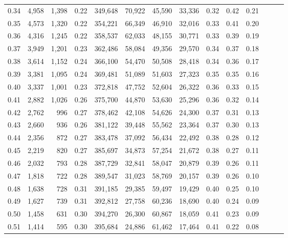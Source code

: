 \begin{tabular}{rrrrrrrrrrrrrr}
0.34 &   4,958 &  1,398 &  0.22 &  349,648 &   70,922 &  45,590 &  33,336 &  0.32 &  0.42 &      0.21 \\
0.35 &   4,573 &  1,320 &  0.22 &  354,221 &   66,349 &  46,910 &  32,016 &  0.33 &  0.41 &      0.20 \\
0.36 &   4,316 &  1,245 &  0.22 &  358,537 &   62,033 &  48,155 &  30,771 &  0.33 &  0.39 &      0.19 \\
0.37 &   3,949 &  1,201 &  0.23 &  362,486 &   58,084 &  49,356 &  29,570 &  0.34 &  0.37 &      0.18 \\
0.38 &   3,614 &  1,152 &  0.24 &  366,100 &   54,470 &  50,508 &  28,418 &  0.34 &  0.36 &      0.17 \\
0.39 &   3,381 &  1,095 &  0.24 &  369,481 &   51,089 &  51,603 &  27,323 &  0.35 &  0.35 &      0.16 \\
0.40 &   3,337 &  1,001 &  0.23 &  372,818 &   47,752 &  52,604 &  26,322 &  0.36 &  0.33 &      0.15 \\
0.41 &   2,882 &  1,026 &  0.26 &  375,700 &   44,870 &  53,630 &  25,296 &  0.36 &  0.32 &      0.14 \\
0.42 &   2,762 &    996 &  0.27 &  378,462 &   42,108 &  54,626 &  24,300 &  0.37 &  0.31 &      0.13 \\
0.43 &   2,660 &    936 &  0.26 &  381,122 &   39,448 &  55,562 &  23,364 &  0.37 &  0.30 &      0.13 \\
0.44 &   2,356 &    872 &  0.27 &  383,478 &   37,092 &  56,434 &  22,492 &  0.38 &  0.28 &      0.12 \\
0.45 &   2,219 &    820 &  0.27 &  385,697 &   34,873 &  57,254 &  21,672 &  0.38 &  0.27 &      0.11 \\
0.46 &   2,032 &    793 &  0.28 &  387,729 &   32,841 &  58,047 &  20,879 &  0.39 &  0.26 &      0.11 \\
0.47 &   1,818 &    722 &  0.28 &  389,547 &   31,023 &  58,769 &  20,157 &  0.39 &  0.26 &      0.10 \\
0.48 &   1,638 &    728 &  0.31 &  391,185 &   29,385 &  59,497 &  19,429 &  0.40 &  0.25 &      0.10 \\
0.49 &   1,627 &    739 &  0.31 &  392,812 &   27,758 &  60,236 &  18,690 &  0.40 &  0.24 &      0.09 \\
0.50 &   1,458 &    631 &  0.30 &  394,270 &   26,300 &  60,867 &  18,059 &  0.41 &  0.23 &      0.09 \\
0.51 &   1,414 &    595 &  0.30 &  395,684 &   24,886 &  61,462 &  17,464 &  0.41 &  0.22 &      0.08 \\

\end{tabular}
